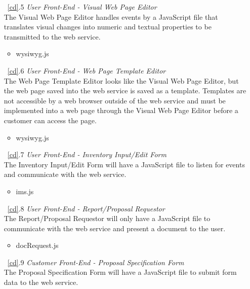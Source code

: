 \documentclass{article}
\newcommand{\br}{\vspace{2mm}}
\begin{document}
\begin{enumerate}
\begin{itemize}
        \end{itemize}
    \item[~\ref{cd}.5 ] \emph{User Front-End - Visual Web Page Editor}\br\\
        The Visual Web Page Editor handles events by a JavaScript file that
        translates visual changes into numeric and textual properties to be
        transmitted to the web service.
        \begin{itemize}
            \item wysiwyg.js
        \end{itemize}
    \item[~\ref{cd}.6 ] \emph{User Front-End - Web Page Template Editor}\br\\
        The Web Page Template Editor looks like the Visual Web Page Editor, but
        the web page saved into the web service is saved as a template.  Templates
        are not accessible by a web browser outside of the web service and must be implemented
        into a web page through the Visual Web Page Editor before a customer can
        access the page.
        \begin{itemize}
            \item wysiwyg.js
        \end{itemize}
    \item[~\ref{cd}.7 ] \emph{User Front-End - Inventory Input/Edit Form}\br\\
        The Inventory Input/Edit Form will have a JavaScript file to listen for
        events and communicate with the web service.
        \begin{itemize}
            \item ims.js
        \end{itemize}
    \item[~\ref{cd}.8 ] \emph{User Front-End - Report/Proposal Requestor}\br\\
        The Report/Proposal Requestor will only have a JavaScript file to
        communicate with the web service and present a document to the user.
        \begin{itemize}
            \item docRequest.js
        \end{itemize}
    \item[~\ref{cd}.9 ] \emph{Customer Front-End - Proposal Specification Form}\br\\
        The Proposal Specification Form will have a JavaScript file to submit
        form data to the web service.
        \begin{itemize}

\end{itemize}
\end{enumerate}
\end{document}
